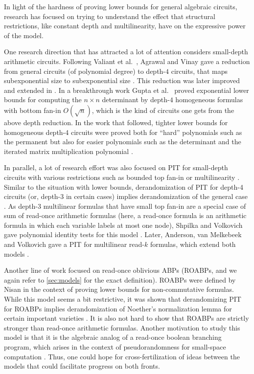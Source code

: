 \documentclass[11pt]{article}
\begin{document}
In light of the hardness of proving lower bounds for general algebraic circuits, research has focused on trying to understand the effect that structural restrictions, like constant depth and multilinearity, have on the expressive power of the model.

One research direction that has attracted a lot of attention considers small-depth arithmetic circuits.
Following Valiant et al.\ \cite{vsbr83}, Agrawal and Vinay gave a reduction from general circuits (of polynomial degree) to depth-$4$ circuits, that maps subexponential size to subexponential size \cite{av08}.
This reduction was later improved and extended in \cite{ koiran, Tav13, gkks13b}.
In a breakthrough work Gupta et al.\ \cite{gkks13} proved exponential lower bounds for computing the $n\times n$ determinant by depth-$4$ homogeneous formulas with bottom fan-in $O(\sqrt{n})$, which is the kind of circuits one gets from the above depth reduction. In the work that followed, tighter lower bounds for homogeneous depth-4 circuits were proved both for ``hard'' polynomials such as the permanent but also for easier polynomials such as the determinant and the iterated matrix multiplication polynomial \cite{KSS13, FLMS13, KLSS, KS14, KS14a}. 

In parallel, a lot of research effort was also focused on PIT for small-depth circuits with various restrictions such as bounded top fan-in or multilinearity \cite{DS07, KS07, ks09, SS12, kmsv13, sv11, osv15}.
Similar to the situation with lower bounds, derandomization of PIT for depth-4 circuits (or, depth-3 in certain cases) implies derandomization of the general case \cite{av08,gkks13b}.
As depth-$3$ multilinear formulas that have small top fan-in are a special case of sum of read-once arithmetic formulas (here, a read-once formula is an arithmetic formula in which each variable labels at most one node), Shpilka and Volkovich gave polynomial identity tests for this model \cite{SV15}.
Later, Anderson, van Melkebeek and Volkovich gave a PIT for multilinear read-$k$ formulas, which extend both models \cite{amv15}.


Another line of work focused on read-once oblivious ABPs (ROABPs, and we again refer to \autoref{sec:models} for the exact definition).
ROABPs were defined by Nisan \cite{nis91} in the context of proving lower bounds for non-commutative formulas.
While this model seems a bit restrictive, it was shown that derandomizing PIT for ROABPs implies derandomization of Noether's normalization lemma for certain important varieties \cite{Mulmuley12,FS13b}.
It is also not hard to show that ROABPs are strictly stronger than read-once arithmetic formulas.
Another motivation to study this model is that it is the algebraic analog of a read-once boolean branching program, which arises in the context of pseudorandomness for small-space computation \cite{Nisan92}.
Thus, one could hope for cross-fertilization of ideas between the models that could facilitate progress on both fronts.
\end{document}
